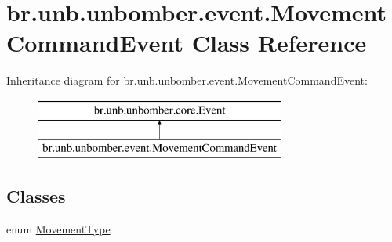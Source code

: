 \hypertarget{classbr_1_1unb_1_1unbomber_1_1event_1_1_movement_command_event}{\section{br.\+unb.\+unbomber.\+event.\+Movement\+Command\+Event Class Reference}
\label{classbr_1_1unb_1_1unbomber_1_1event_1_1_movement_command_event}
}
Inheritance diagram for br.\+unb.\+unbomber.\+event.\+Movement\+Command\+Event\+:\begin{figure}[H]
\begin{center}
\leavevmode
\includegraphics[height=2.000000cm]{classbr_1_1unb_1_1unbomber_1_1event_1_1_movement_command_event}
\end{center}
\end{figure}
\subsection*{Classes}
\begin{DoxyCompactItemize}
\item 
enum \hyperlink{enumbr_1_1unb_1_1unbomber_1_1event_1_1_movement_command_event_1_1_movement_type}{Movement\+Type}
\end{DoxyCompactItemize}
